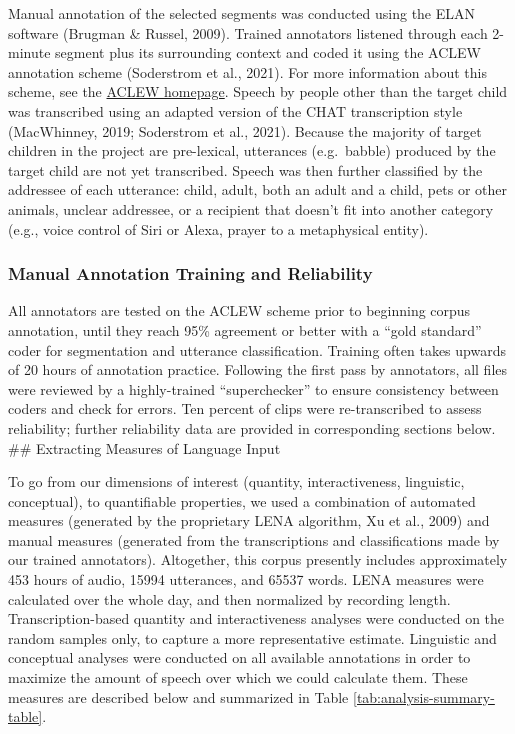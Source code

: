 \documentclass[
  man]{apa6}
\begin{document}
Manual annotation of the selected segments was conducted using the ELAN software (Brugman \& Russel, 2009). Trained annotators listened through each 2-minute segment plus its surrounding context and coded it using the ACLEW annotation scheme (Soderstrom et al., 2021). For more information about this scheme, see the \href{https://sites.google.com/view/aclewdid/home}{ACLEW homepage}. Speech by people other than the target child was transcribed using an adapted version of the CHAT transcription style (MacWhinney, 2019; Soderstrom et al., 2021). Because the majority of target children in the project are pre-lexical, utterances (e.g.~babble) produced by the target child are not yet transcribed. Speech was then further classified by the addressee of each utterance: child, adult, both an adult and a child, pets or other animals, unclear addressee, or a recipient that doesn't fit into another category (e.g., voice control of Siri or Alexa, prayer to a metaphysical entity).

\hypertarget{manual-annotation-training-and-reliability}{%
\subsubsection{Manual Annotation Training and Reliability}\label{manual-annotation-training-and-reliability}}

All annotators are tested on the ACLEW scheme prior to beginning corpus annotation, until they reach 95\% agreement or better with a ``gold standard'' coder for segmentation and utterance classification. Training often takes upwards of 20 hours of annotation practice. Following the first pass by annotators, all files were reviewed by a highly-trained ``superchecker'' to ensure consistency between coders and check for errors. Ten percent of clips were re-transcribed to assess reliability; further reliability data are provided in corresponding sections below.
\#\# Extracting Measures of Language Input

To go from our dimensions of interest (quantity, interactiveness, linguistic, conceptual), to quantifiable properties, we used a combination of automated measures (generated by the proprietary LENA algorithm, Xu et al., 2009) and manual measures (generated from the transcriptions and classifications made by our trained annotators). Altogether, this corpus presently includes approximately 453 hours of audio, 15994 utterances, and 65537 words. LENA measures were calculated over the whole day, and then normalized by recording length. Transcription-based quantity and interactiveness analyses were conducted on the random samples only, to capture a more representative estimate. Linguistic and conceptual analyses were conducted on all available annotations in order to maximize the amount of speech over which we could calculate them. These measures are described below and summarized in Table \ref{tab:analysis-summary-table}.
\end{document}
